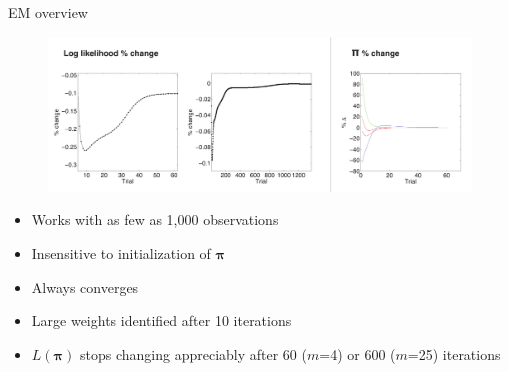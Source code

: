 \documentclass{beamer}
\newcommand{\vect}[1]{\boldsymbol{\mathbf{#1}}}
\newcommand{\vp}{\vect{\pi}}
\newcommand{\llp}{L(\vp)}
\begin{document}
\begin{frame}{EM overview}
	
	\begin{figure}
			\begin{center}
				\includegraphics[width=\textwidth]{diag_simple.pdf}
			\end{center}
	\end{figure}
	
	\begin{itemize}
		\item Works with as few as 1,000 observations
		\item Insensitive to initialization of $\vect{\pi}$
		\item Always converges
		\item Large weights identified after 10 iterations
		\item $\llp$ stops changing appreciably after 60 ($m$=4) or 600 ($m$=25) iterations
	\end{itemize}
	
	
	
\end{frame}
\end{document}
